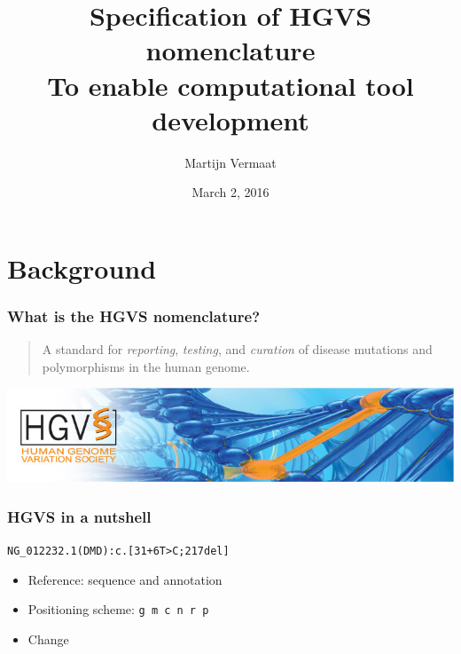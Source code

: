 \documentclass[14pt]{beamer}
\title{Specification of \textcolor{hgvs}{HGVS} nomenclature\\
  {\small To enable computational tool development}}
\author{Martijn Vermaat}
\institute{Human Genetics, LUMC}
\date{\small March 2, 2016}
\begin{document}
\titlepage




\section{Background}




\begin{frame}
  \frametitle{What is the \textcolor{hgvs}{HGVS} nomenclature?}

  \vspace{\baselineskip}

  \begin{quote}
    A standard for {\em reporting}, {\em testing}, and {\em curation} of
    disease mutations and polymorphisms in the human genome.
  \end{quote}

  \begin{center}
    \includegraphics[width=\textwidth]{pictures/hgvs.png}
  \end{center}
\end{frame}


\begin{frame}[fragile]
  \frametitle{\textcolor{hgvs}{HGVS} in a nutshell}

\begin{alltt}
\textcolor<2>{hgvs}{NG_012232.1(DMD)}:\textcolor<3>{hgvs}{c}.\textcolor<4>{hgvs}{[31+6T>C;217del]}
\end{alltt}

  \pause

  \begin{itemize}[<+->]
    \item Reference: sequence and annotation
    \item Positioning scheme: \verb|g m c n r p|
    \item Change
  \end{itemize}
\end{frame}
\end{document}
